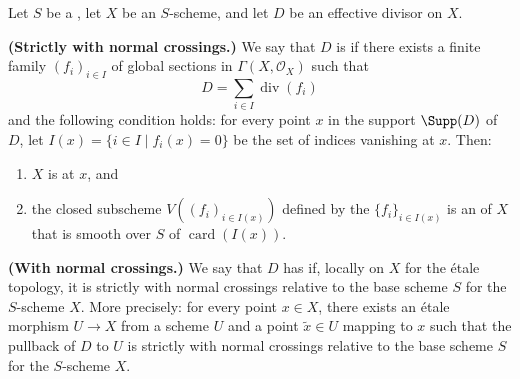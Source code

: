 \begin{definition} \label{definition:divisor_with_normal_crossings_relative_to_base_scheme_for_a_scheme_over_a_scheme}
Let $S$ be a , let $X$ be an $S$-scheme, and let $D$ be an effective divisor on $X$.

\textbf{(Strictly with normal crossings.)} We say that $D$ is  if there exists a finite family $(f_i)_{i \in I}$ of global sections in $\Gamma(X, \mathcal{O}_X)$ such that
$$D = \sum_{i \in I} \operatorname{div}(f_i)$$
and the following condition holds: for every point $x$ in the support $\Supp(D)$ of $D$, let $I(x) = \{ i \in I \mid f_i(x) = 0 \}$ be the set of indices vanishing at $x$. Then:
\begin{enumerate}
    \item $X$ is  at $x$, and
    \item the closed subscheme $V((f_i)_{i \in I(x)})$ defined by the  $\{ f_i \}_{i \in I(x)}$ is an  of $X$ that is smooth over $S$ of  $\operatorname{card}(I(x))$.
\end{enumerate}

\textbf{(With normal crossings.)} We say that $D$ has  if, locally on $X$ for the étale topology, it is strictly with normal crossings relative to the base scheme $S$ for the $S$-scheme $X$. More precisely: for every point $x \in X$, there exists an étale morphism $U \to X$ from a scheme $U$ and a point $\tilde{x} \in U$ mapping to $x$ such that the pullback of $D$ to $U$ is strictly with normal crossings relative to the base scheme $S$ for the $S$-scheme $X$.
\end{definition}
